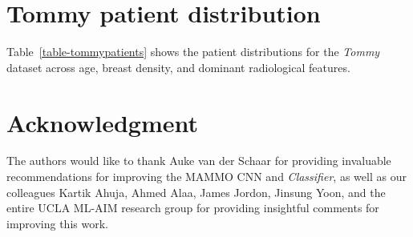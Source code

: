\documentclass[journal]{IEEEtran}
\begin{document}
\section{\label{Appendix:Tommy} Tommy patient distribution}

Table~\ref{table-tommypatients} shows the patient distributions for the \textit{Tommy} dataset across age, breast density, and dominant radiological features. 


\section*{Acknowledgment}
The authors would like to thank Auke van der Schaar for providing invaluable recommendations for improving the MAMMO CNN and \textit{Classifier}, as well as our colleagues Kartik Ahuja, Ahmed Alaa, James Jordon, Jinsung Yoon, and the entire UCLA ML-AIM research group for providing insightful comments for improving this work.   




\ifCLASSOPTIONcaptionsoff
  \newpage
\fi





\end{document}
